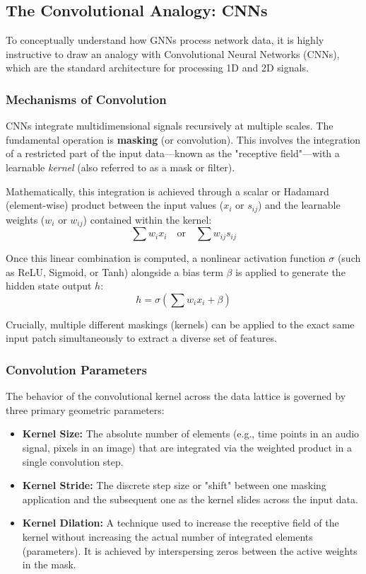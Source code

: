 \subsection{The Convolutional Analogy: CNNs}
\label{subsec:convolutional_analogy}

To conceptually understand how GNNs process network data, it is highly instructive to draw an analogy with Convolutional Neural Networks (CNNs), which are the standard architecture for processing 1D and 2D signals.

\subsubsection{Mechanisms of Convolution}

CNNs integrate multidimensional signals recursively at multiple scales. The fundamental operation is \textbf{masking} (or convolution). This involves the integration of a restricted part of the input data—known as the "receptive field"—with a learnable \textit{kernel} (also referred to as a mask or filter).

Mathematically, this integration is achieved through a scalar or Hadamard (element-wise) product between the input values ($x_i$ or $s_{ij}$) and the learnable weights ($w_i$ or $w_{ij}$) contained within the kernel:
$$ \sum w_i x_i \quad \text{or} \quad \sum w_{ij} s_{ij} $$

Once this linear combination is computed, a nonlinear activation function $\sigma$ (such as ReLU, Sigmoid, or Tanh) alongside a bias term $\beta$ is applied to generate the hidden state output $h$:
$$ h = \sigma\left(\sum w_i x_i + \beta\right) $$

Crucially, multiple different maskings (kernels) can be applied to the exact same input patch simultaneously to extract a diverse set of features.

\subsubsection{Convolution Parameters}

The behavior of the convolutional kernel across the data lattice is governed by three primary geometric parameters:
\begin{itemize}
    \item \textbf{Kernel Size:} The absolute number of elements (e.g., time points in an audio signal, pixels in an image) that are integrated via the weighted product in a single convolution step.
    \item \textbf{Kernel Stride:} The discrete step size or "shift" between one masking application and the subsequent one as the kernel slides across the input data.
    \item \textbf{Kernel Dilation:} A technique used to increase the receptive field of the kernel without increasing the actual number of integrated elements (parameters). It is achieved by interspersing zeros between the active weights in the mask.
\end{itemize}

